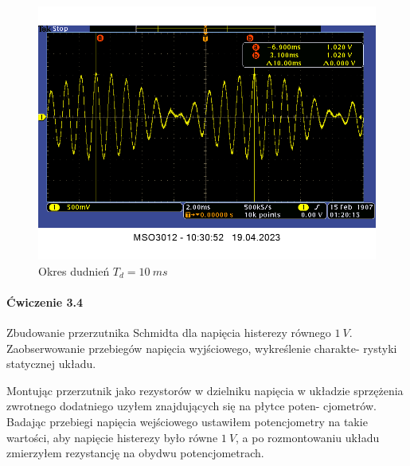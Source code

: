 \documentclass[14pt, table]{extarticle}
\begin{document}
\begin{figure}[H]
\includegraphics[scale=0.6]{A19}
\centering
\captionsetup{labelformat=empty}
\caption{Okres dudnień $T_d = 10 \ ms$}
\end{figure}

\newpage
\paragraph{Ćwiczenie 3.4 \\}
Zbudowanie przerzutnika Schmidta dla napięcia histerezy równego $ 1 \ V$. Zaobserwowanie przebiegów napięcia wyjściowego, wykreślenie charakte- rystyki statycznej układu.

\begin{figure}[H]
    \centering
    \subfloat[\centering ]{{\texttt{[image: C5]}}}%
    \qquad
    \subfloat[\centering ]{{\texttt{[image: C6]}}}%
\end{figure}

Montując przerzutnik jako rezystorów w dzielniku napięcia w układzie sprzężenia zwrotnego dodatniego uzyłem znajdujących się na płytce poten- cjometrów. Badając przebiegi napięcia wejściowego ustawiłem potencjometry na takie wartości, aby napięcie histerezy było równe $1 \ V$, a po rozmontowaniu układu zmierzyłem rezystancję na obydwu potencjometrach.\\
\end{document}
